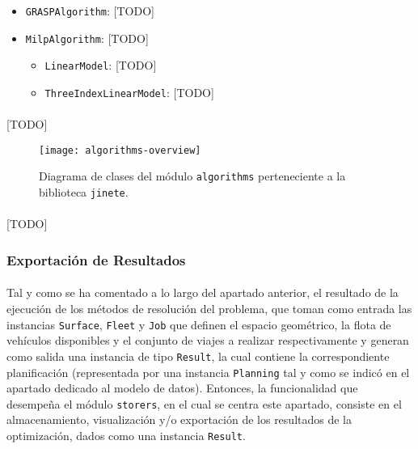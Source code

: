 \documentclass{subfiles}
\begin{document}
\begin{itemize}
              \item \texttt{GRASPAlgorithm}: [TODO]

              \item \texttt{MilpAlgorithm}: [TODO]
          
                  \begin{itemize}

                      \item \texttt{LinearModel}: [TODO]
                  
                      \item \texttt{ThreeIndexLinearModel}: [TODO]
                  
                  \end{itemize}

          \end{itemize}

          \paragraph{}
          [TODO]

          \begin{sidewaysfigure}[ht]
            \centering
            \texttt{[image: algorithms-overview]}
            \caption{Diagrama de clases del módulo \texttt{algorithms} perteneciente a la biblioteca \texttt{jinete}.}
            \label{img:algorithms_overview}
          \end{sidewaysfigure}

          \paragraph{}
          [TODO]

        \subsubsection{Exportación de Resultados}
        \label{sec:implementation_components_exportation}

          \paragraph{}
          Tal y como se ha comentado a lo largo del apartado anterior, el resultado de la ejecución de los métodos de resolución del problema, que toman como entrada las instancias \texttt{Surface}, \texttt{Fleet} y \texttt{Job} que definen el espacio geométrico, la flota de vehículos disponibles y el conjunto de viajes a realizar respectivamente y generan como salida una instancia de tipo \texttt{Result}, la cual contiene la correspondiente planificación (representada por una instancia \texttt{Planning} tal y como se indicó en el apartado dedicado al modelo de datos). Entonces, la funcionalidad que desempeña el módulo \texttt{storers}, en el cual se centra este apartado, consiste en el almacenamiento, visualización y/o exportación de los resultados de la optimización, dados como una instancia \texttt{Result}.
\end{document}
